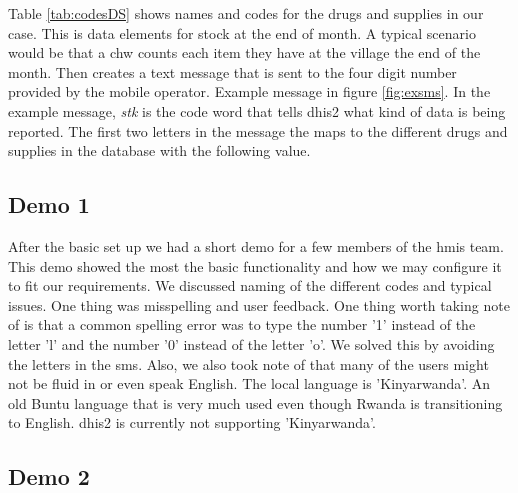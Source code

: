 Table \ref{tab:codesDS} shows names and codes for the drugs and supplies in our case. 
This is data elements for stock at the end of month.
A typical scenario would be that a \gls{chw} counts each item they have at the village the end of the month. Then creates a text message that is sent to the four digit number provided by the mobile operator. Example message in figure \ref{fig:exsms}. In the example message, \textit{stk} is the code word that tells \gls{dhis2} what kind of data is being reported. The first two letters in the message the maps to the different drugs and supplies in the database with the following value.  

\subsection{Demo 1}
After the basic set up we had a short demo for a few members of the \gls{hmis} team. 
This demo showed the most the basic functionality and how we may configure it to fit our requirements. We discussed naming of the different codes and typical issues. One thing was misspelling and user feedback. 
One thing worth taking note of is that a common spelling error was to type the number '1' instead of the letter 'l' and the number '0' instead of the letter 'o'. We solved this by avoiding the letters in the \gls{sms}. Also, we also took note of that many of the users might not be fluid in or even speak English. The local language is 'Kinyarwanda'. An old Buntu language that is very much used even though Rwanda is transitioning to English. \gls{dhis2} is currently not supporting 'Kinyarwanda'.

\subsection{Demo 2}

